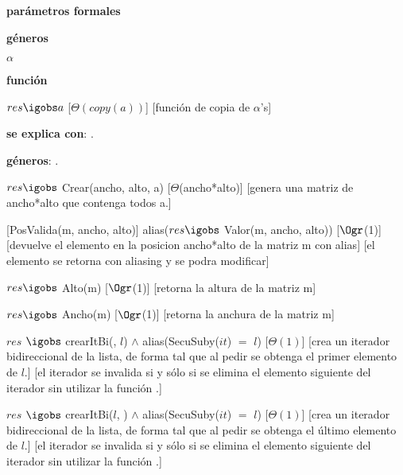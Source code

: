 
\begin{Interfaz}
  
  \textbf{parámetros formales}\parindent\\
  \parbox{1.7cm}{\textbf{géneros}} $\alpha$\\
  \parbox[t]{1.7cm}{\textbf{función}}\parbox[t]{\textwidth-2\parindent-1.7cm}{%
    {$res \igobs a$}
    [$\Theta(copy(a))$]
    [función de copia de $\alpha$'s]
  }

  \textbf{se explica con}: .

  \textbf{géneros}: .
  

  {$res \igobs$ Crear(ancho, alto, a)}
  [$\Theta$(ancho*alto)]
  [genera una matriz de ancho*alto que contenga todos a.]

  [PosValida(m, ancho, alto)]
  {alias($res \igobs$ Valor(m, ancho, alto))}
  [$\Ogr$(1)]
  [devuelve el elemento en la posicion ancho*alto de la matriz m con alias]
  [el elemento se retorna con aliasing y se podra modificar]
  
  {$res \igobs$ Alto(m)}  
  [$\Ogr$(1)]
  [retorna la altura de la matriz m]
  
  {$res \igobs$ Ancho(m)}  
  [$\Ogr$(1)]
  [retorna la anchura de la matriz m]
  
  

  {$res$ $\igobs$ crearItBi(\secuencia{}, $l$) $\land$ alias(SecuSuby($it$) $=$ $l$)}
  [$\Theta(1)$]
  [crea un iterador bidireccional de la lista, de forma tal que al pedir  se obtenga el primer elemento de $l$.]
  [el iterador se invalida si y sólo si se elimina el elemento siguiente del iterador sin utilizar la función .]

  {$res$ $\igobs$ crearItBi($l$, \secuencia{}) $\land$ alias(SecuSuby($it$) $=$ $l$)}
  [$\Theta(1)$]
  [crea un iterador bidireccional de la lista, de forma tal que al pedir  se obtenga el último elemento de $l$.]  
  [el iterador se invalida si y sólo si se elimina el elemento siguiente del iterador sin utilizar la función .]

  
  
  
\end{Interfaz}
